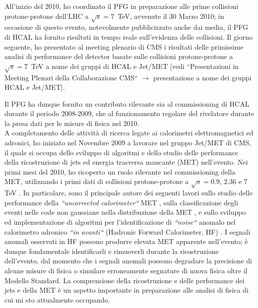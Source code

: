 \documentclass[10pt, a4paper]{article}
\begin{document}
All'inizio del 2010, ho coordinato il PFG in preparazione alle 
prime collisioni protone-protone dell'LHC a $\sqrt{s}=7$~TeV, avvenute il 30 Marzo 2010; in occasione di questo evento, 
notevolmente pubblicizzato anche dai media, il PFG di HCAL ha fornito risultati in tempo reale 
sull'evidenza delle collisioni. Il giorno seguente, ho presentato al meeting plenario di CMS i risultati delle 
primissime analisi di performance del detector basate sulle collisioni protone-protone a $\sqrt{s}=7$~TeV a nome dei gruppi di HCAL e Jet/MET 
[vedi ``Presentazioni in Meeting Plenari della Collaborazione CMS`` $\rightarrow$ presentazione 
a nome dei gruppi HCAL e Jet/MET].

Il PFG ha dunque fornito un contributo rilevante sia al commissioning 
di HCAL durante il periodo 2008-2009, che al funzionamento regolare del rivelatore durante la presa dati 
per le misure di fisica nel 2010. \\

A completamento delle attivit\`a di ricerca legate ai calorimetri elettromagnetici ed adronici, ho iniziato nel Novembre 2009 a 
lavorare nel gruppo Jet/MET di CMS, il quale si occupa dello sviluppo di algoritmi e dello studio delle performance della ricostruzione 
di jets ed energia trasversa mancante (MET) nell'evento. Nei primi mesi del 2010, ho ricoperto un ruolo rilevante nel commissioning 
della MET, utilizzando i primi dati di collisioni protone-protone a $\sqrt{s}=$0.9, 2.36 \cite{JME-10-002} e 7 TeV \cite{JME-10-004}.
In particolare, sono il principale autore dei seguenti lavori sullo studio delle performance della {\it ``uncorrected calorimeter``} 
MET \cite{AN-2010-029},  sulla classificazione degli eventi nelle code non gaussiane nella distribuzione della MET \cite{AN-2010-219}, 
e sullo sviluppo ed implementazione di algoritmi per l'identificazione di {\it ``noise``} anomalo nel calorimetro 
adronico {\it ``in avanti``} (Hadronic Forward Calorimeter, HF) \cite{DN-2010-008}. I segnali anomali 
osservati in HF possono produrre elevata MET apparente nell'evento; \`e dunque fondamentale 
identificarli e rimuoverli durante la ricostruzione dell'evento, dal momento che i segnali anomali possono 
degradare la precisione di alcune misure di fisica o simulare erroneamente segnature di nuova fisica oltre il Modello Standard. 
La comprensione della ricostruzione e delle performance dei jets e della MET \`e un aspetto importante 
in preparazione alle analisi di fisica di cui mi sto attualmente occupando. \\
\end{document}
